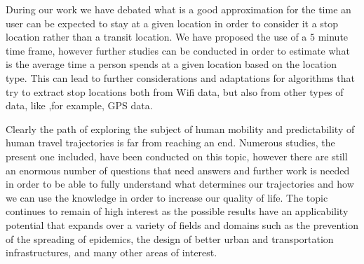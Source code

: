 During our work we have debated what is a good approximation for the time an
user can be expected to stay at a given location in order to consider it a stop
location rather than a transit location. We have proposed the use of a $5$
minute time frame, however further studies can be conducted in order to estimate
what is the average time a person spends at a given location based on the
location type. This can lead to further considerations and adaptations for
algorithms that try to extract stop locations both from Wifi data, but also from
other types of data, like ,for example, GPS data.

Clearly the path of exploring the subject of human mobility and predictability
of human travel trajectories is far from reaching an end. Numerous studies, the
present one included, have been conducted on this topic, however there are
still an enormous number of questions that need answers and further work is
needed in order to be able to fully understand what determines our trajectories
and how we can use the knowledge in order to increase our quality of life. The
topic continues to remain of high interest as the possible results have an
applicability potential that expands over a variety of fields and domains such
as the prevention of the spreading of epidemics, the design of better urban and
transportation infrastructures, and many other areas of interest.